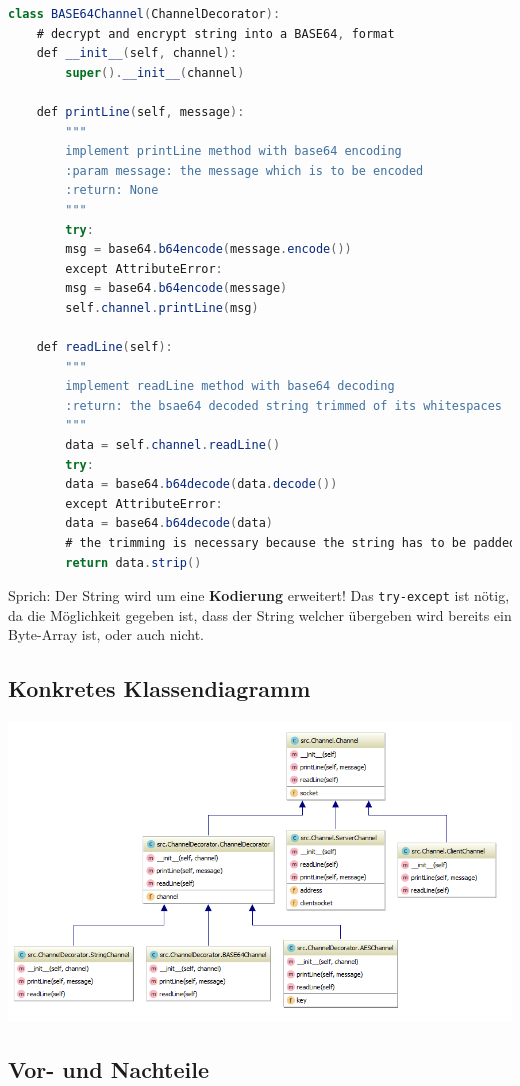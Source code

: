 \begin{lstlisting}[language=Java]
class BASE64Channel(ChannelDecorator):
	# decrypt and encrypt string into a BASE64, format
	def __init__(self, channel):
		super().__init__(channel)
	
	def printLine(self, message):
		"""
		implement printLine method with base64 encoding
		:param message: the message which is to be encoded
		:return: None
		"""
		try:
		msg = base64.b64encode(message.encode())
		except AttributeError:
		msg = base64.b64encode(message)
		self.channel.printLine(msg)
	
	def readLine(self):
		"""
		implement readLine method with base64 decoding
		:return: the bsae64 decoded string trimmed of its whitespaces
		"""
		data = self.channel.readLine()
		try:
		data = base64.b64decode(data.decode())
		except AttributeError:
		data = base64.b64decode(data)
		# the trimming is necessary because the string has to be padded by the AES encoding
		return data.strip()
\end{lstlisting}
Sprich: Der String wird um eine \textbf{Kodierung} erweitert! Das \verb|try-except| ist nötig, da die Möglichkeit gegeben ist, dass der String welcher übergeben wird bereits ein Byte-Array ist, oder auch nicht. 

\subsection{Konkretes Klassendiagramm}
\begin{minipage}{\linewidth}
	\centering
	\includegraphics[width=1\linewidth]{images/uml_specific}
\end{minipage}

\subsection{Vor- und Nachteile}
\cite{MorganNeill}

